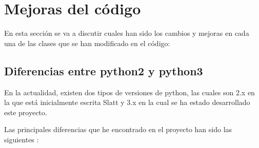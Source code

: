 \documentclass{cosas/tfg_domingo}
\begin{document}
\newpage

\section{Mejoras del código}
En esta sección se va a discutir cuales han sido los cambios y mejoras en cada una de las clases que se han modificado en el código:

\subsection{Diferencias entre python2 y python3}

En la actualidad, existen dos tipos de versiones de python, las cuales son 2.x en la que está inicialmente escrita Slatt y 3.x en la cual se ha estado desarrollado este proyecto.

Las principales diferencias que he encontrado en el proyecto han sido las siguientes \citep{diferencias}:
\end{document}
